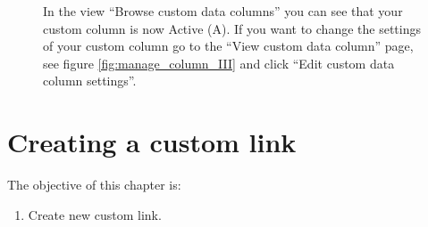 \begin{figure}[ht]
  \begin{shaded}
		\caption{In the view ``Browse custom data columns'' you can see that your custom column is now Active (A).\newline
		If you want to change the settings of your custom column go to the ``View custom data column'' page, 
		 see figure \ref{fig:manage_column_III} and click ``Edit custom data column settings''.}
	  \label{fig:manage_column_V}
  \end{shaded}
\end{figure}











\chapter{Creating a custom link}
The objective of this chapter is:
\begin{enumerate}
	\item 
	Create new custom link.
\end{enumerate}

